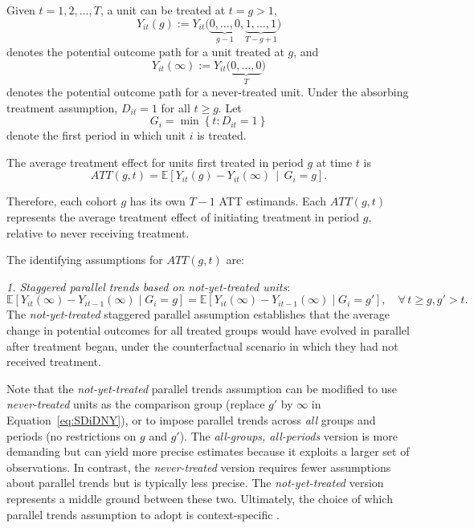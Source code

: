 Given $t = 1, 2, \dots, T$, a unit can be treated at $t = g > 1$,  
\[
Y_{it}(g) := Y_{it}\big(\underbrace{0, \dots, 0}_{g-1}, \underbrace{1, \dots, 1}_{T-g+1}\big)
\]
denotes the potential outcome path for a unit treated at $g$, and
\[
Y_{it}(\infty) := Y_{it}\big(\underbrace{0, \dots, 0}_{T}\big)
\]
denotes the potential outcome path for a never-treated unit.  
Under the absorbing treatment assumption, $D_{it} = 1$ for all $t \geq g$. Let
\[
G_i = \min\left\{ t : D_{it} = 1 \right\}
\]
denote the first period in which unit $i$ is treated.

The average treatment effect for units first treated in period $g$ at time $t$ is
\[
ATT(g,t) = \mathbb{E}\left[ Y_{it}(g) - Y_{it}(\infty) \,\middle|\, G_i = g \right].
\]

Therefore, each cohort $g$ has its own $T-1$ ATT estimands. Each $ATT(g,t)$ represents the average treatment effect of initiating treatment in period $g$, relative to never receiving treatment.

The identifying assumptions for $ATT(g,t)$ are:

\textit{1. Staggered parallel trends based on not-yet-treated units}:
\begin{equation}\label{eq:SDiDNY}
	\mathbb{E}[Y_{it}(\infty) - Y_{it-1}(\infty) \mid G_i = g] 
	= \mathbb{E}[Y_{it}(\infty) - Y_{it-1}(\infty) \mid G_i = g'], \quad \forall\, t \geq g, g'>t.
\end{equation}
The \textit{not-yet-treated} staggered parallel assumption establishes that the average change in potential outcomes for all treated groups would have evolved in parallel after treatment began, under the counterfactual scenario in which they had not received treatment.

Note that the \textit{not-yet-treated} parallel trends assumption can be modified to use \textit{never-treated} units as the comparison group (replace $g'$ by $\infty$ in Equation~\ref{eq:SDiDNY}), or to impose parallel trends across \textit{all} groups and periods (no restrictions on $g$ and $g'$). The \textit{all-groups, all-periods} version is more demanding but can yield more precise estimates because it exploits a larger set of observations. In contrast, the \textit{never-treated} version requires fewer assumptions about parallel trends but is typically less precise. The \textit{not-yet-treated} version represents a middle ground between these two. Ultimately, the choice of which parallel trends assumption to adopt is context-specific \cite{baker2025did_guide}.

